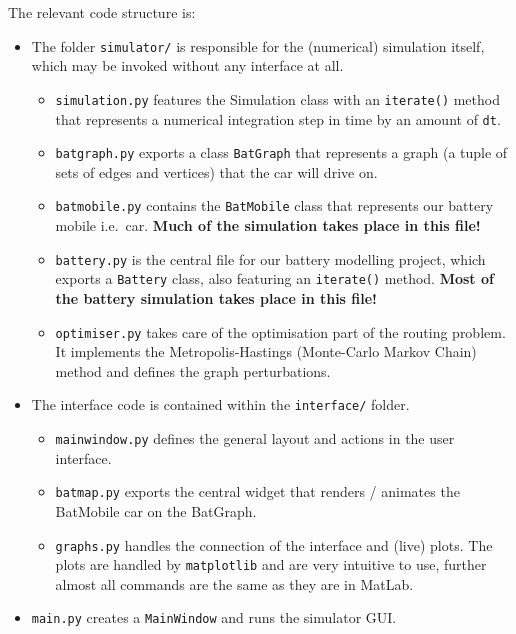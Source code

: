 \documentclass{prettytex/ox/mmsc-special-topic}
\begin{document}
  The relevant code structure is:

  \begin{itemize}
    \tightlist
    \item
          The folder \texttt{simulator/} is responsible for the (numerical)
          simulation itself, which may be invoked without any interface at all.

          \begin{itemize}
            \tightlist
            \item
                  \texttt{simulation.py} features the Simulation class with an
                  \texttt{iterate()} method that represents a numerical integration
                  step in time by an amount of \texttt{dt}.
            \item
                  \texttt{batgraph.py} exports a class \texttt{BatGraph} that
                  represents a graph (a tuple of sets of edges and vertices) that the
                  car will drive on.
            \item
                  \texttt{batmobile.py} contains the \texttt{BatMobile} class that
                  represents our battery mobile i.e.~car. \textbf{Much of the
                    simulation takes place in this file!}
            \item
                  \texttt{battery.py} is the central file for our battery modelling
                  project, which exports a \texttt{Battery} class, also featuring an
                  \texttt{iterate()} method. \textbf{Most of the battery simulation
                    takes place in this file!}
            \item
                  \texttt{optimiser.py} takes care of the optimisation part of the routing problem. It implements the Metropolis-Hastings (Monte-Carlo Markov Chain) method and defines the graph perturbations.
          \end{itemize}
    \item
          The interface code is contained within the \texttt{interface/} folder.

          \begin{itemize}
            \tightlist
            \item
                  \texttt{mainwindow.py} defines the general layout and actions in the
                  user interface.
            \item
                  \texttt{batmap.py} exports the central widget that renders /
                  animates the BatMobile car on the BatGraph.
            \item
                  \texttt{graphs.py} handles the connection of the interface and
                  (live) plots. The plots are handled by \texttt{matplotlib} and are
                  very intuitive to use, further almost all commands are the same as
                  they are in MatLab.
          \end{itemize}
    \item
          \texttt{main.py} creates a \texttt{MainWindow} and runs the simulator
          GUI.
  \end{itemize}
\end{document}
